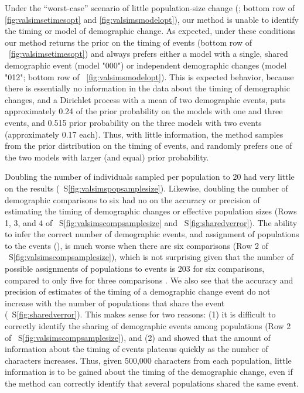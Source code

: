 \ifembed{

}{}

Under the ``worst-case'' scenario of little population-size change
(\vsimnochange; bottom row of \figs \ref{fig:valsimsetimesopt} and
\ref{fig:valsimsmodelopt}),
our method is unable to identify the timing or model of demographic change.
As expected, under these conditions our method returns the prior on the timing
of events (bottom row of \fig{}~\ref{fig:valsimsetimesopt})
and always prefers either a model with a single, shared demographic
event (model "000") or independent demographic changes (model "012";
bottom row of \fig{}~\ref{fig:valsimsmodelopt}).
This is expected behavior, because there is essentially no information in the
data about the timing of demographic changes, and a Dirichlet process with a
mean of two demographic events, puts approximately 0.24 of the prior
probability on the models with one and three events, and 0.515 prior
probability on the three models with two events (approximately 0.17 each).
Thus, with little information, the method samples from the prior distribution
on the timing of events, and randomly prefers one of the two models with larger
(and equal) prior probability.

Doubling the number of individuals sampled per population to 20 had very little
 on the results
(\fig{}~S\ref{fig:valsimspopsamplesize}).
Likewise, doubling the number of demographic comparisons to six had no 
on the accuracy or precision of estimating the timing of demographic changes
or effective population sizes
(Rows 1, 3, and 4 of \fig{}~S\ref{fig:valsimscompsamplesize}
and \fig{}~S\ref{fig:sharedverror}).
The ability to infer the correct number of demographic events,
and assignment of populations to the events (\etimesets),
is much worse when there are six comparisons
(Row 2 of \fig{}~S\ref{fig:valsimscompsamplesize}),
which is not surprising given that the number of possible assignments of
populations to events is 203 for six comparisons, compared to only five for
three comparisons \citep{Bell1934}.
We also see that
the accuracy and precision of estimates of the timing of a demographic change
event do not increase with the number of populations that share the event
(\fig{}~S\ref{fig:sharedverror}).
This makes sense for two reasons:
(1) it is difficult to correctly identify the sharing of demographic events
among populations
(Row 2 of \fig{}~S\ref{fig:valsimscompsamplesize}),
and
(2) \citet{Oaks2018ecoevolity} and \citet{Oaks2018paic}
showed that the amount of information about the timing of events plateaus
quickly as the number of characters increases.
Thus, given 500,000 characters from each population, little information is to
be gained about the timing of the demographic change, even if the method can
correctly identify that several populations shared the same event.


